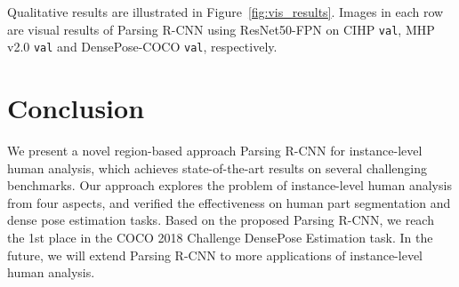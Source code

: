 \documentclass[10pt,twocolumn,letterpaper]{article}
\begin{document}
Qualitative results are illustrated in Figure~\ref{fig:vis_results}. Images in each row are visual results of Parsing R-CNN using ResNet50-FPN on CIHP \texttt{val}, MHP v2.0 \texttt{val} and DensePose-COCO \texttt{val}, respectively. 





\section{Conclusion} We present a novel region-based approach Parsing R-CNN for instance-level human analysis, which achieves state-of-the-art results on several challenging benchmarks. Our approach explores the problem of instance-level human analysis from four aspects, and verified the effectiveness on human part segmentation and dense pose estimation tasks. Based on the proposed Parsing R-CNN, we reach the 1st place in the COCO 2018 Challenge DensePose Estimation task. In the future, we will extend Parsing R-CNN to more applications of instance-level human analysis.


{\small


}
\end{document}
